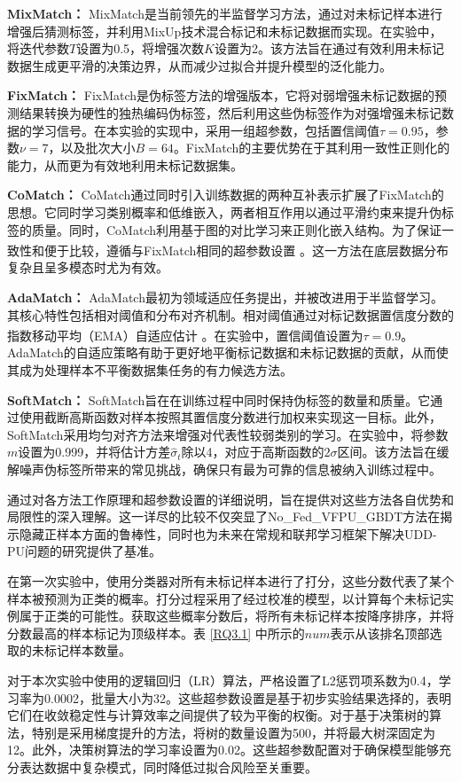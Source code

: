 \textbf{MixMatch：} MixMatch是当前领先的半监督学习方法，通过对未标记样本进行增强后猜测标签，并利用MixUp技术混合标记和未标记数据而实现。在实验中，将迭代参数$T$设置为0.5，将增强次数$K$设置为2。该方法旨在通过有效利用未标记数据生成更平滑的决策边界，从而减少过拟合并提升模型的泛化能力。

\textbf{FixMatch：} FixMatch是伪标签方法的增强版本，它将对弱增强未标记数据的预测结果转换为硬性的独热编码伪标签，然后利用这些伪标签作为对强增强未标记数据的学习信号。在本实验的实现中，采用一组超参数，包括置信阈值$\tau = 0.95$，参数$\nu = 7$，以及批次大小$B = 64$。FixMatch的主要优势在于其利用一致性正则化的能力，从而更为有效地利用未标记数据集。

\textbf{CoMatch：} CoMatch通过同时引入训练数据的两种互补表示扩展了FixMatch的思想。它同时学习类别概率和低维嵌入，两者相互作用以通过平滑约束来提升伪标签的质量。同时，CoMatch利用基于图的对比学习来正则化嵌入结构。为了保证一致性和便于比较，遵循与FixMatch相同的超参数设置 \textsuperscript{\cite{sohn2020fixmatch}}。这一方法在底层数据分布复杂且呈多模态时尤为有效。

\textbf{AdaMatch：} AdaMatch最初为领域适应任务提出，并被改进用于半监督学习。其核心特性包括相对阈值和分布对齐机制。相对阈值通过对标记数据置信度分数的指数移动平均（EMA）自适应估计 \textsuperscript{\cite{tarvainen2017mean}}。在实验中，置信阈值设置为$\tau = 0.9$。AdaMatch的自适应策略有助于更好地平衡标记数据和未标记数据的贡献，从而使其成为处理样本不平衡数据集任务的有力候选方法。

\textbf{SoftMatch：} SoftMatch旨在在训练过程中同时保持伪标签的数量和质量。它通过使用截断高斯函数对样本按照其置信度分数进行加权来实现这一目标。此外，SoftMatch采用均匀对齐方法来增强对代表性较弱类别的学习。在实验中，将参数$m$设置为0.999，并将估计方差${{\hat \sigma }_t}$除以4，对应于高斯函数的$2\sigma$区间。该方法旨在缓解噪声伪标签所带来的常见挑战，确保只有最为可靠的信息被纳入训练过程中。

通过对各方法工作原理和超参数设置的详细说明，旨在提供对这些方法各自优势和局限性的深入理解。这一详尽的比较不仅突显了No\_Fed\_VFPU\_GBDT方法在揭示隐藏正样本方面的鲁棒性，同时也为未来在常规和联邦学习框架下解决UDD-PU问题的研究提供了基准。


在第一次实验中，使用分类器对所有未标记样本进行了打分，这些分数代表了某个样本被预测为正类的概率。打分过程采用了经过校准的模型，以计算每个未标记实例属于正类的可能性。获取这些概率分数后，将所有未标记样本按降序排序，并将分数最高的样本标记为顶级样本。表 \ref{RQ3.1} 中所示的$ num $表示从该排名顶部选取的未标记样本数量。

对于本次实验中使用的逻辑回归（LR）算法，严格设置了L2惩罚项系数为0.4，学习率为0.0002，批量大小为32。这些超参数设置是基于初步实验结果选择的，表明它们在收敛稳定性与计算效率之间提供了较为平衡的权衡。对于基于决策树的算法，特别是采用梯度提升的方法，将树的数量设置为500，并将最大树深固定为12。此外，决策树算法的学习率设置为0.02。这些超参数配置对于确保模型能够充分表达数据中复杂模式，同时降低过拟合风险至关重要。


